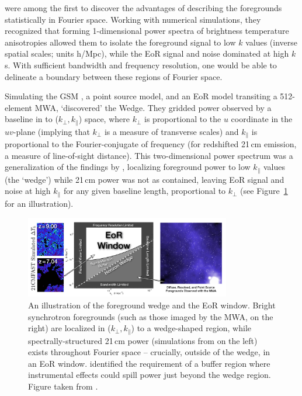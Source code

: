 \cite{Wang.06} were among the first to discover the advantages of describing the foregrounds statistically in Fourier space. Working with numerical simulations, they recognized that forming 1-dimensional power spectra of brightness temperature anisotropies allowed them to isolate the foreground signal to low $k$ values (inverse spatial scales; units h/Mpc), while the EoR signal and noise dominated at high $k$s. With sufficient bandwidth and frequency resolution, one would be able to delineate a boundary between these regions of Fourier space.

Simulating the GSM \citep{GSM.08}, a point source model, and an EoR model transiting a 512-element MWA, \cite{Datta.10} `discovered' the Wedge. They gridded power observed by a baseline in to ($k_{\perp}, k_{\parallel}$) space, where $k_{\perp}$ is proportional to the $u$ coordinate in the $uv$-plane (implying that $k_{\perp}$ is a measure of transverse scales) and $k_{\parallel}$ is proportional to the Fourier-conjugate of frequency (for redshifted 21\,cm emission, a measure of line-of-sight distance). This two-dimensional power spectrum was a generalization of the findings by \cite{Wang.06}, localizing foreground power to low $k_{\parallel}$ values (the `wedge') while 21\,cm power was not as contained, leaving EoR signal and noise at high $k_{\parallel}$ for any given baseline length, proportional to $k_{\perp}$ (see Figure~\ref{fig:eor_theory_wedge_cartoon} for an illustration).

\begin{figure}
\centering
\includegraphics[width=0.8\textwidth]{chapters/eor_window_theory/figures/deBoerWedge.png}
\caption[An illustration of the foreground wedge and the EoR window.]{An illustration of the foreground wedge and the EoR window. Bright synchrotron foregrounds (such as those imaged by the MWA, on the right) are localized in ($k_{\perp}, k_{\parallel}$) to a wedge-shaped region, while spectrally-structured 21\,cm power (simulations from \cite{Mesinger.11} on the left) exists throughout Fourier space -- crucially, outside of the wedge, in an EoR window. \cite{Pober.13} identified the requirement of a buffer region where instrumental effects could spill power just beyond the wedge region. Figure taken from \cite{deBoer.17}.}
\label{fig:eor_theory_wedge_cartoon}
\end{figure}

